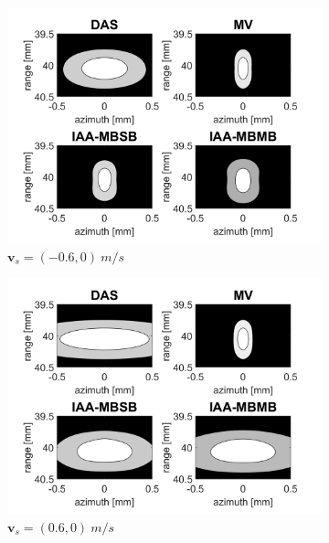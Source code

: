 \begin{figure}[ht]
    \centering
    \begin{subfigure}[t]{0.48\linewidth}
        \includegraphics[width=\linewidth]{./images/results/2.1/motion_0_-06.png}
        \caption{$\boldsymbol{v}_s = (-0.6, 0)~m/s$}
    \end{subfigure}
    \quad
    \begin{subfigure}[t]{0.48\linewidth}
        \includegraphics[width=\linewidth]{./images/results/2.1/motion_0_06.png}
        \caption{$\boldsymbol{v}_s = (0.6, 0)~m/s$}
    \end{subfigure}
    \quad
    \begin{subfigure}[t]{0.48\linewidth}

\end{subfigure}
\end{figure}

